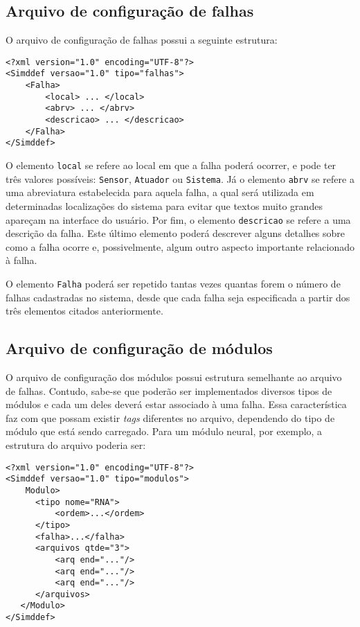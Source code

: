 \subsection{Arquivo de configuração de falhas}
O arquivo de configuração de falhas possui a seguinte estrutura:

\vspace{1.1\topsep}
\begin{verbatim}
<?xml version="1.0" encoding="UTF-8"?>
<Simddef versao="1.0" tipo="falhas">
    <Falha>
        <local> ... </local>
        <abrv> ... </abrv>
        <descricao> ... </descricao>
    </Falha>
</Simddef>
\end{verbatim}
\vspace{1.1\topsep}

O elemento \verb|local| se refere ao local em que a falha poderá ocorrer, e pode
ter três valores possíveis: \verb|Sensor|, \verb|Atuador| ou \verb|Sistema|. Já
o elemento \verb|abrv| se refere a uma abreviatura estabelecida para aquela
falha, a qual será utilizada em determinadas localizações do sistema para evitar
que textos muito grandes apareçam na interface do usuário. Por fim, o elemento
\verb|descricao| se refere a uma descrição da falha. Este último elemento
poderá descrever alguns detalhes sobre como a falha ocorre e, possivelmente,
algum outro aspecto importante relacionado à falha.

O elemento \verb|Falha| poderá ser repetido tantas vezes quantas forem o número
de falhas cadastradas no sistema, desde que cada falha seja especificada a
partir dos três elementos citados anteriormente.

\subsection{Arquivo de configuração de módulos}
O arquivo de configuração dos módulos possui estrutura semelhante ao arquivo de
falhas. Contudo, sabe-se que poderão ser implementados diversos tipos de módulos
e cada um deles deverá estar associado à uma falha. Essa característica faz com
que possam existir {\it tags} diferentes no arquivo, dependendo do tipo de
módulo que está sendo carregado. Para um módulo neural, por exemplo, a estrutura
do arquivo poderia ser:

\vspace{1.1\topsep}
\begin{verbatim}
<?xml version="1.0" encoding="UTF-8"?>
<Simddef versao="1.0" tipo="modulos">
    Modulo>
      <tipo nome="RNA">
          <ordem>...</ordem>
      </tipo>
      <falha>...</falha>
      <arquivos qtde="3">
          <arq end="..."/>
          <arq end="..."/>
          <arq end="..."/>
      </arquivos>
   </Modulo>
</Simddef>
\end{verbatim}
\vspace{1.1\topsep}

